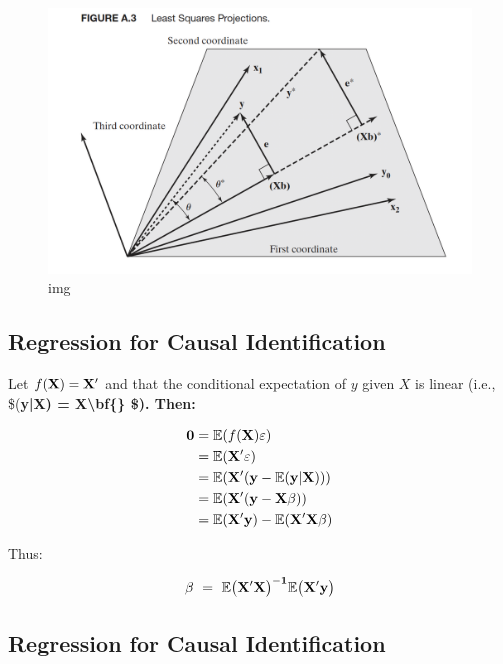 \documentclass[11pt]{article}
\begin{document}
\begin{figure}
\centering
\includegraphics{../img/regasproj.png}
\caption{img}
\end{figure}

    \hypertarget{regression-for-causal-identification}{%
\subsection{Regression for Causal
Identification}\label{regression-for-causal-identification}}

Let \(f(\bf{X}) = \bf{X}'\) and that the conditional expectation of
\(y\) given \(X\) is linear (i.e.,
\$(\bf{y}|\bf{X}) = \bf{X}\textbackslash bf\{\beta\} \$).
Then:

\[
\begin{align}
\bf{0} & = \mathbb{E}(f(\bf{X})\bf{\varepsilon}) \\
        & = \mathbb{E}(\bf{X}'\bf{\varepsilon}) \\
        & = \mathbb{E}(\bf{X}'(\bf{y} - \mathbb{E}(\bf{y}|\bf{X}))) \\
        & = \mathbb{E}(\bf{X}'(\bf{y} - \bf{X}\bf{\beta})) \\
        & = \mathbb{E}(\bf{X}'\bf{y}) - \mathbb{E}(\bf{X}'\bf{X}\bf{\beta})
\end{align}
\]

Thus:

\[ \bf{\beta} \ = \ \mathbb{E}\big(\bf{X}'\bf{X}\big)^{-1}\mathbb{E}\big(\bf{X}'\bf{y}\big) \]

    \hypertarget{regression-for-causal-identification}{%
\subsection{Regression for Causal
Identification}\label{regression-for-causal-identification}}
\end{document}
